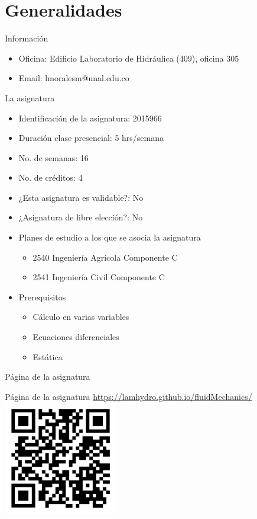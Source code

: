 \documentclass [xcolor=svgnames, t] {beamer}
\begin{document}
\section{Generalidades}
\begin{frame}{Informaci\'on}
\begin{exampleblock}{}
\begin{itemize}
\item \alert{Oficina}: Edificio Laboratorio de Hidr\'aulica (409), oficina 305 
\item \alert{Email}: lmoralesm@unal.edu.co
\end{itemize}
\end{exampleblock}
\end{frame}

\begin{frame}{La asignatura}
\begin{itemize}
\item Identificaci\'on de la asignatura: \alert{2015966}
\item Duraci\'on clase presencial: \alert{5 hrs/semana}
\item No. de semanas: \alert{16}
\item No. de cr\'editos: \alert{4}
\item ¿Esta asignatura es validable?: \alert{No}
\item ¿Asignatura de libre elecci\'on?: \alert{No}
\item Planes de estudio a los que se asocia la asignatura
\begin{itemize}
\item \alert{2540 Ingenier\'ia Agr\'icola Componente C}
\item \alert{2541 Ingenier\'ia Civil Componente C}
\end{itemize}
\item Prerequisitos
\begin{itemize}
\item \alert{C\'alculo en varias variables}
\item \alert{Ecuaciones diferenciales}
\item \alert{Est\'atica}
\end{itemize}
\end{itemize}
\end{frame}

\begin{frame}{P\'agina de la asignatura}
\begin{block}{P\'agina de la asignatura}
\href{https://lamhydro.github.io/fluidMechanics/}{https://lamhydro.github.io/fluidMechanics/}
\centering
\includegraphics[width=5cm]{qrCode}
\end{block}
\end{frame}
\end{document}

